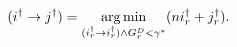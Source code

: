 \documentclass[letterpaper]{article} %
\DeclareMathOperator*{\argmin}{arg\,min}
\theoremstyle{definition}
\newtheorem{definition}{Definition}
\newcommand{\LE}{\mathcal{L}}
\begin{document}
\begin{equation}\label{eq:reduction}\small
    (i^\dagger \rightarrow j^\dagger) = \argmin_{(i^\dagger_r \rightarrow i^\dagger_r) \land G^D_r < \gamma^*} (ni^\dagger_r+j^\dagger_r). 
\end{equation}








\end{document}
